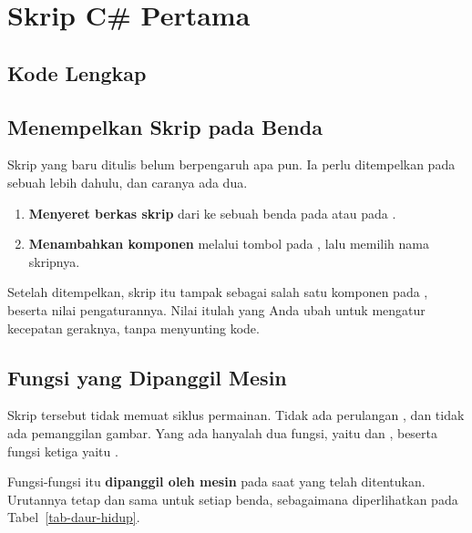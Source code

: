 \section{Skrip C\# Pertama}
\label{sec:skrip-pertama}

\subsection{Kode Lengkap}


\subsection{Menempelkan Skrip pada Benda}

Skrip yang baru ditulis belum berpengaruh apa pun. Ia perlu ditempelkan pada
sebuah  lebih dahulu, dan caranya ada dua.

\begin{enumerate}
  \item \textbf{Menyeret berkas skrip} dari  ke sebuah
        benda pada  atau pada .
  \item \textbf{Menambahkan komponen} melalui tombol 
        pada , lalu memilih nama skripnya.
\end{enumerate}

Setelah ditempelkan, skrip itu tampak sebagai salah satu komponen pada
, beserta nilai pengaturannya. Nilai itulah yang Anda ubah
untuk mengatur kecepatan geraknya, tanpa menyunting kode.

\subsection{Fungsi yang Dipanggil Mesin}

Skrip tersebut tidak memuat siklus permainan. Tidak ada
perulangan , dan tidak ada pemanggilan gambar. Yang ada hanyalah
dua fungsi, yaitu  dan , beserta fungsi ketiga yaitu
.

Fungsi-fungsi itu \textbf{dipanggil oleh mesin} pada saat yang telah
ditentukan. Urutannya tetap dan sama untuk setiap benda, sebagaimana
diperlihatkan pada Tabel~\ref{tab-daur-hidup}.

